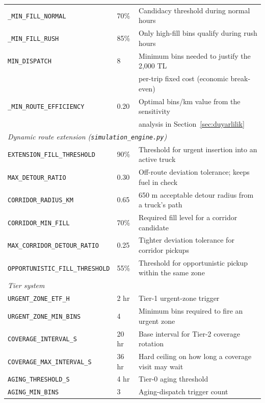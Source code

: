 \documentclass[12pt,a4paper]{report}
\begin{document}
\begin{itemize}[leftmargin=*]
\begin{table}[H]
\begin{tabular}{lll}
\texttt{\_MIN\_FILL\_NORMAL}  & 70\%  & Candidacy threshold during normal hours \\
\texttt{\_MIN\_FILL\_RUSH}    & 85\%  & Only high-fill bins qualify during rush hours \\
\texttt{MIN\_DISPATCH}        & 8     & Minimum bins needed to justify the 2,000 TL \\
                              &       & per-trip fixed cost (economic break-even) \\
\texttt{\_MIN\_ROUTE\_EFFICIENCY} & 0.20 & Optimal bins/km value from the sensitivity \\
                              &        & analysis in Section~\ref{sec:duyarlilik} \\
\midrule
\multicolumn{3}{l}{\textit{Dynamic route extension (\texttt{simulation\_engine.py})}} \\
\texttt{EXTENSION\_FILL\_THRESHOLD}    & 90\% & Threshold for urgent insertion into an active truck \\
\texttt{MAX\_DETOUR\_RATIO}            & 0.30 & Off-route deviation tolerance; keeps fuel in check \\
\texttt{CORRIDOR\_RADIUS\_KM}          & 0.65 & 650 m acceptable detour radius from a truck's path \\
\texttt{CORRIDOR\_MIN\_FILL}           & 70\% & Required fill level for a corridor candidate \\
\texttt{MAX\_CORRIDOR\_DETOUR\_RATIO}  & 0.25 & Tighter deviation tolerance for corridor pickups \\
\texttt{OPPORTUNISTIC\_FILL\_THRESHOLD} & 55\% & Threshold for opportunistic pickup within the same zone \\
\midrule
\multicolumn{3}{l}{\textit{Tier system}} \\
\texttt{URGENT\_ZONE\_ETF\_H}       & 2 hr  & Tier-1 urgent-zone trigger \\
\texttt{URGENT\_ZONE\_MIN\_BINS}    & 4     & Minimum bins required to fire an urgent zone \\
\texttt{COVERAGE\_INTERVAL\_S}      & 20 hr & Base interval for Tier-2 coverage rotation \\
\texttt{COVERAGE\_MAX\_INTERVAL\_S} & 36 hr & Hard ceiling on how long a coverage visit may wait \\
\texttt{AGING\_THRESHOLD\_S}        & 4 hr  & Tier-0 aging threshold \\
\texttt{AGING\_MIN\_BINS}           & 3     & Aging-dispatch trigger count \\
\bottomrule
\end{tabular}
\end{table}



\end{itemize}
\end{document}
